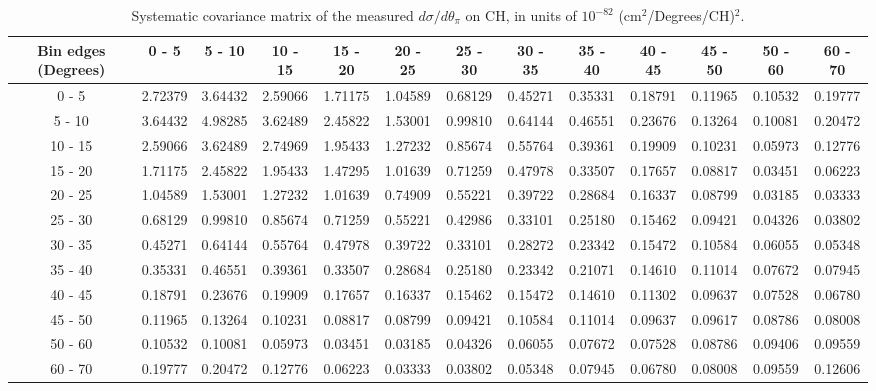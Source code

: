 \documentclass[aps,prl,twocolumn,superscriptaddress,nofootinbib]{revtex4-1}
\begin{document}
\begin{turnpage}
 \begin{table}[h!]
  \centering
  \caption{Systematic covariance matrix of the measured $d\sigma/d\theta_{\pi}$ on CH, in units of $10^{-82}$ (cm$^{2}$/Degrees/CH)$^{2}$.}
    \begin{tabular}{c||cccccccccccc}
      Bin edges (Degrees) & 0 - 5 & 5 - 10 & 10 - 15 & 15 - 20 & 20 - 25 & 25 - 30 & 30 - 35 & 35 - 40 & 40 - 45 & 45 - 50 & 50 - 60 & 60 - 70 \\
\hline \hline
        0 - 5 &  2.72379 &  3.64432 &  2.59066 &  1.71175 &  1.04589 &  0.68129 &  0.45271 &  0.35331 &  0.18791 &  0.11965 &  0.10532 &  0.19777 \\
       5 - 10 &  3.64432 &  4.98285 &  3.62489 &  2.45822 &  1.53001 &  0.99810 &  0.64144 &  0.46551 &  0.23676 &  0.13264 &  0.10081 &  0.20472 \\
      10 - 15 &  2.59066 &  3.62489 &  2.74969 &  1.95433 &  1.27232 &  0.85674 &  0.55764 &  0.39361 &  0.19909 &  0.10231 &  0.05973 &  0.12776 \\
      15 - 20 &  1.71175 &  2.45822 &  1.95433 &  1.47295 &  1.01639 &  0.71259 &  0.47978 &  0.33507 &  0.17657 &  0.08817 &  0.03451 &  0.06223 \\
      20 - 25 &  1.04589 &  1.53001 &  1.27232 &  1.01639 &  0.74909 &  0.55221 &  0.39722 &  0.28684 &  0.16337 &  0.08799 &  0.03185 &  0.03333 \\
      25 - 30 &  0.68129 &  0.99810 &  0.85674 &  0.71259 &  0.55221 &  0.42986 &  0.33101 &  0.25180 &  0.15462 &  0.09421 &  0.04326 &  0.03802 \\
      30 - 35 &  0.45271 &  0.64144 &  0.55764 &  0.47978 &  0.39722 &  0.33101 &  0.28272 &  0.23342 &  0.15472 &  0.10584 &  0.06055 &  0.05348 \\
      35 - 40 &  0.35331 &  0.46551 &  0.39361 &  0.33507 &  0.28684 &  0.25180 &  0.23342 &  0.21071 &  0.14610 &  0.11014 &  0.07672 &  0.07945 \\
      40 - 45 &  0.18791 &  0.23676 &  0.19909 &  0.17657 &  0.16337 &  0.15462 &  0.15472 &  0.14610 &  0.11302 &  0.09637 &  0.07528 &  0.06780 \\
      45 - 50 &  0.11965 &  0.13264 &  0.10231 &  0.08817 &  0.08799 &  0.09421 &  0.10584 &  0.11014 &  0.09637 &  0.09617 &  0.08786 &  0.08008 \\
      50 - 60 &  0.10532 &  0.10081 &  0.05973 &  0.03451 &  0.03185 &  0.04326 &  0.06055 &  0.07672 &  0.07528 &  0.08786 &  0.09406 &  0.09559 \\
      60 - 70 &  0.19777 &  0.20472 &  0.12776 &  0.06223 &  0.03333 &  0.03802 &  0.05348 &  0.07945 &  0.06780 &  0.08008 &  0.09559 &  0.12606 \\
    \end{tabular}
  \label{tablecov:CH_Systematic_ThetaPi}
  \end{table}
\end{turnpage}
\end{document}

